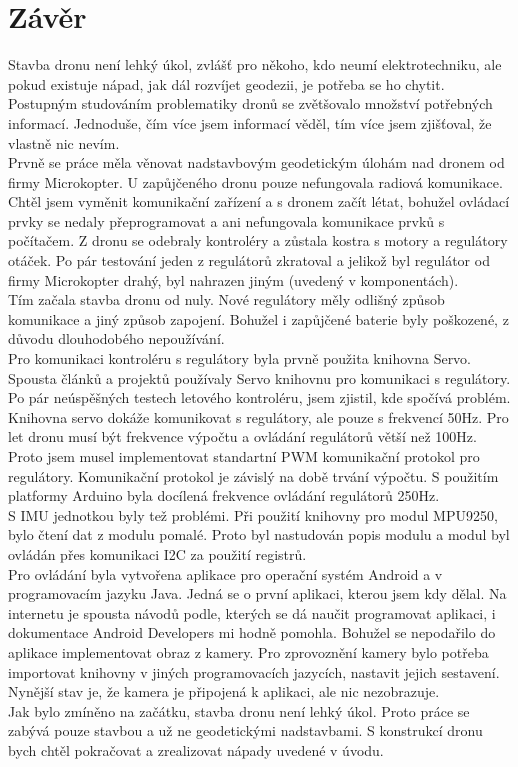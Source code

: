\chapter{Závěr}
\label{8-zaver}
Stavba dronu není lehký úkol, zvlášť pro někoho, kdo neumí elektrotechniku, ale pokud existuje nápad, jak dál rozvíjet geodezii, je potřeba se ho chytit. Postupným studováním problematiky dronů se zvětšovalo množství potřebných informací. Jednoduše, čím více jsem informací věděl, tím více jsem zjišťoval, že vlastně nic nevím.\\
Prvně se práce měla věnovat nadstavbovým geodetickým úlohám nad dronem od firmy Microkopter. U zapůjčeného dronu pouze nefungovala radiová komunikace. Chtěl jsem vyměnit komunikační zařízení a s dronem začít létat, bohužel ovládací prvky se nedaly přeprogramovat a ani nefungovala komunikace prvků s počítačem. Z dronu se odebraly kontroléry a zůstala kostra s motory a regulátory otáček. Po pár testování jeden z regulátorů zkratoval a jelikož byl regulátor od firmy Microkopter drahý, byl nahrazen jiným (uvedený v komponentách).\\
Tím začala stavba dronu od nuly. Nové regulátory měly odlišný způsob komunikace a jiný způsob zapojení. Bohužel i zapůjčené baterie byly poškozené, z důvodu dlouhodobého nepoužívání.\\
Pro komunikaci kontroléru s regulátory byla prvně použita knihovna Servo. Spousta článků a projektů používaly Servo knihovnu pro komunikaci s regulátory. Po pár neúspěšných testech letového kontroléru, jsem zjistil, kde spočívá problém. Knihovna servo dokáže komunikovat s regulátory, ale pouze s frekvencí 50Hz. Pro let dronu musí být frekvence výpočtu a ovládání regulátorů větší než 100Hz. Proto jsem musel implementovat standartní PWM komunikační protokol pro regulátory. Komunikační protokol je závislý na době trvání výpočtu. S použitím platformy Arduino byla docílená frekvence ovládání regulátorů 250Hz.\\
S IMU jednotkou byly tež problémi. Při použití knihovny pro modul MPU9250, bylo čtení dat z modulu pomalé. Proto byl nastudován popis modulu a modul byl ovládán přes komunikaci I2C za použití registrů.\\
Pro ovládání byla vytvořena aplikace pro operační systém Android a v programovacím jazyku Java. Jedná se o první aplikaci, kterou jsem kdy dělal. Na internetu je spousta návodů podle, kterých se dá naučit programovat aplikaci, i dokumentace Android Developers mi hodně pomohla. Bohužel se nepodařilo do aplikace implementovat obraz z kamery. Pro zprovoznění kamery bylo potřeba importovat knihovny v jiných programovacích jazycích, nastavit jejich sestavení. Nynější stav je, že kamera je připojená k aplikaci, ale nic nezobrazuje.\\
Jak bylo zmíněno na začátku, stavba dronu není lehký úkol. Proto práce se zabývá pouze stavbou a už ne geodetickými nadstavbami. S konstrukcí dronu bych chtěl pokračovat a zrealizovat nápady uvedené v úvodu.\\
